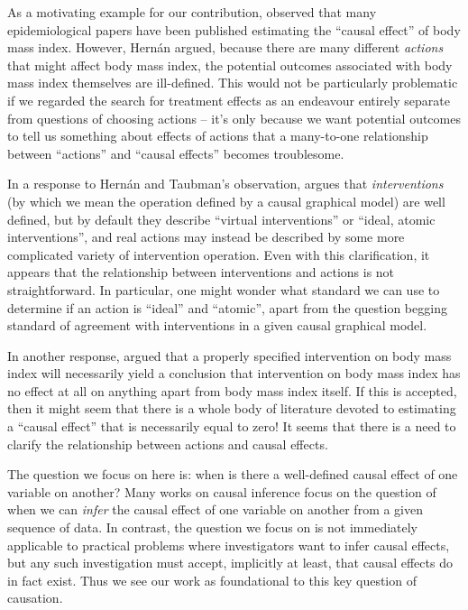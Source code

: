 \documentclass{article}
\theoremstyle{plain}
\theoremstyle{definition}
\begin{document}
As a motivating example for our contribution, \citet{hernan_does_2008} observed that many epidemiological papers have been published estimating the ``causal effect'' of body mass index. However, Hernán argued, because there are many different \emph{actions} that might affect body mass index, the potential outcomes associated with body mass index themselves are ill-defined. This would not be particularly problematic if we regarded the search for treatment effects as an endeavour entirely separate from questions of choosing actions -- it's only because we want potential outcomes to tell us something about effects of actions that a many-to-one relationship between ``actions'' and ``causal effects'' becomes troublesome.

In a response to Hernán and Taubman's observation, \citet{pearl_does_2018} argues that \emph{interventions} (by which we mean the operation defined by a causal graphical model) are well defined, but by default they describe ``virtual interventions'' or ``ideal, atomic interventions'', and real actions may instead be described by some more complicated variety of intervention operation. Even with this clarification, it appears that the relationship between interventions and actions is not straightforward. In particular, one might wonder what standard we can use to determine if an action is ``ideal'' and ``atomic'', apart from the question begging standard of agreement with interventions in a given causal graphical model.

In another response, \citet{shahar_association_2009} argued that a properly specified intervention on body mass index will necessarily yield a conclusion that intervention on body mass index has no effect at all on anything apart from body mass index itself. If this is accepted, then it might seem that there is a whole body of literature devoted to estimating a ``causal effect'' that is necessarily equal to zero! It seems that there is a need to clarify the relationship between actions and causal effects.

The question we focus on here is: when is there a well-defined causal effect of one variable on another? Many works on causal inference focus on the question of when we can \emph{infer} the causal effect of one variable on another from a given sequence of data. In contrast, the question we focus on is not immediately applicable to practical problems where investigators want to infer causal effects, but any such investigation must accept, implicitly at least, that causal effects do in fact exist. Thus we see our work as foundational to this key question of causation. 
\end{document}
